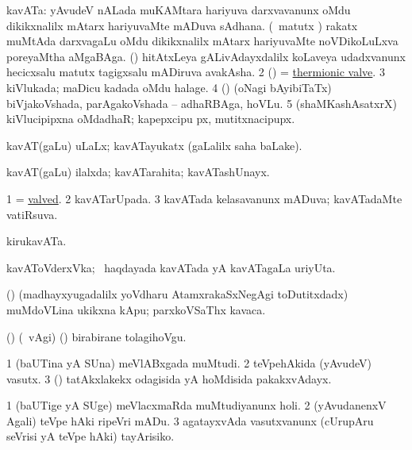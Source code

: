 \bentry
{} 
\gl{\nA}
\expl{}
\bmng
\bnum
{} kavATa: 
\banum
{} yAvudeV nALada muKAMtara hariyuva darxvavanunx oMdu dikikxnalilx mAtarx hariyuvaMte mADuva sAdhana. 
 (\aMrashA\ matutx \pArxvi) rakatx muMtAda darxvagaLu oMdu dikikxnalilx mAtarx hariyuvaMte noVDikoLuLxva poreyaMtha aMgaBAga. 
 (\saM) hitAtxLeya gALivAdayxdalilx koLaveya udadxvanunx hecicxsalu matutx tagigxsalu mADiruva avakAsha. 
\eanum
\numie
\num{2} (\birx) = \hyperref{kandict_t.pdf}{T}{thermionic valve}{thermionic valve}. 
\num{3} kiVlukada; maDicu kadada oMdu halage. 
\num{4} (\savi) (oNagi bAyibiTaTx) biVjakoVshada, parAgakoVshada -- adhaRBAga, hoVLu. 
\num{5} (shaMKashAsatxrX) kiVlucipipxna oMdadhaR; kapepxcipu px, mutitxnacipupx. 
\enum
\emng
\eentry

\bentry
{} 
\gl{\gu}
\expl{}
\bmng
 kavAT(gaLu) uLaLx; kavATayukatx (\saMpa gaLalilx saha baLake). 
\emng
\eentry

\bentry
{} 
\gl{\gu}
\expl{}
\bmng
 kavAT(gaLu) ilalxda; kavATarahita; kavATashUnayx. 
\emng
\eentry

\bentry
{} 
\gl{\gu}
\expl{}
\bmng
\bnum
\num{1} = \hyperlink{valved}{valved}. 
\num{2} kavATarUpada. 
\num{3} kavATada kelasavanunx mADuva; kavATadaMte vatiRsuva. 
\enum
\emng
\eentry

\bentry
{} 
\gl{\nA}
\expl{}
\bmng
 kirukavATa. 
\emng
\eentry

\bentry
{} 
\gl{\nA}
\expl{}
\bmng
 kavAToVderxVka; \kanmu\ haqdayada kavATada yA kavATagaLa uriyUta. 
\emng
\eentry

\bentry
{} 
\gl{\nA}
\expl{}
\bmng
 (\ca) (madhayxyugadalilx yoVdharu AtamxrakaSxNegAgi toDutitxdadx) muMdoVLina ukikxna kApu; parxkoVSaThx kavaca. 
\emng
\eentry

\bentry
{} 
\gl{\akirx}
\expl{}
\bmng
 (\ame) (\kanmu\ \BAavayx vAgi) (\ashi) birabirane tolagihoVgu. 
\emng
\eentry

\bentry
{} 
\gl{\nA}
\expl{}
\bmng
\bnum
\num{1} (baUTina yA SUna) meVlABxgada muMtudi. 
\num{2} teVpehAkida (yAvudeV) vasutx. 
\num{3} (\saM) tatAkxlakekx odagisida yA hoMdisida pakakxvAdayx. 
\enum
\emng
\eentry

\bentry
{} 
\gl{\sakirx}
\expl{}
\bmng
\bnum
\num{1} (baUTige yA SUge) meVlacxmaRda muMtudiyanunx holi. 
\num{2} (yAvudanenxV Agali) teVpe hAki ripeVri mADu. 
\num{3} agatayxvAda vasutxvanunx (cUrupAru seVrisi yA teVpe hAki) tayArisiko. 
\enum
\emng

